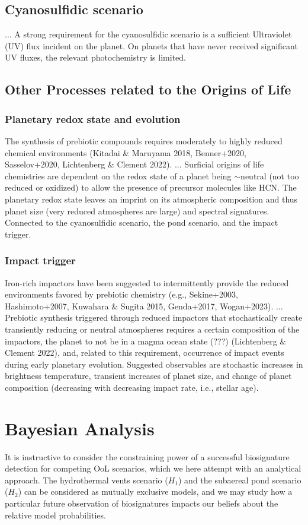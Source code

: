 \documentclass[twocolumn]{aastex631}
\begin{document}
\subsection{Cyanosulfidic scenario}
...
A strong requirement for the cyanosulfidic scenario is a sufficient Ultraviolet (UV) flux incident on the planet.
On planets that have never received significant UV fluxes, the relevant photochemistry is limited.

\subsection{Other Processes related to the Origins of Life}
\subsubsection{Planetary redox state and evolution}
The synthesis of prebiotic compounds requires moderately to highly reduced chemical environments (Kitadai \& Maruyama 2018, Benner+2020, Sasselov+2020, Lichtenberg \& Clement 2022).
...
Surficial origins of life chemistries are dependent on the redox state of a planet being $\sim$neutral (not too reduced or oxidized) to allow the presence of precursor molecules like HCN. The planetary redox state leaves an imprint on its atmospheric composition and thus planet size (very reduced atmospheres are large) and spectral signatures. Connected to the cyanosulfidic scenario, the pond scenario, and the impact trigger.

\subsubsection{Impact trigger}
Iron-rich impactors have been suggested to intermittently provide the reduced environments favored by prebiotic chemistry (e.g., Sekine+2003, Hashimoto+2007, Kuwahara \& Sugita 2015, Genda+2017, Wogan+2023).
...
Prebiotic synthesis triggered through reduced impactors that stochastically create transiently reducing or neutral atmospheres requires a certain composition of the impactors, the planet to not be in a magma ocean state (???) (Lichtenberg \& Clement 2022), and, related to this requirement, occurrence of impact events during early planetary evolution.
Suggested observables are stochastic increases in brightness temperature, transient increases of planet size, and change of planet composition (decreasing with decreasing impact rate, i.e., stellar age).




\section{Bayesian Analysis}
It is instructive to consider the constraining power of a successful biosignature detection for competing OoL scenarios, which we here attempt with an analytical approach.
The hydrothermal vents scenario ($H_1$) and the subaereal pond scenario ($H_2$) can be considered as mutually exclusive models, and we may study how a particular future observation of biosignatures impacts our beliefs about the relative model probabilities.
\end{document}
